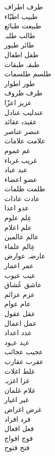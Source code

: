 \documentclass[a4paper]{article}
\begin{document}
\begin{multicols}{3}
\begin{tabbing}
طرف \> اطراف\\
طبیب \> اطبّاء\\
طبیعت \> طبائع\\
طالب \> طلبہ\\
طائر \> طیور\\
طفل \> اطفال\\
طبقہ \> طبقات\\
طلسم \> طلسمات\\
طور \> اطوار\\
ظرف \> ظروف\\
عزیز \> اعزّا\\
عندلیب \> عنادل\\
عقیدہ \> عقائد\\
عنصر \> عناصر\\
علامت \> علامات\\
غم \> غموم\\
غریب \> غرباء\\
عبد \> عباد\\
عضو \> اعضاء\\
ظلمت \> ظلمات\\
عادت \> عادات\\
عدو \> اعدا\\
عِلم \> علوم\\
علم \> اعلام\\
عالم \> عالمین\\
عِالم \> علماء\\
عارضہ \> عوارض\\
عمر \> اعمار\\
عیب \> عیوب\\
عاشق \> عُشاق\\
عزم \> عزائم\\
عام \> عوام\\
عقل \> عقول\\
عمل \> اعمال\\
عدد \> اعداد\\
عہد \> عہود\\
عجیب \> عجائب\\
عقرب \> عقارب\\
غلط \> اغلات\\
غزا \> اغزیہ\\
غلام \> غلمان\\
غیر \> اغیار\\
غرض \> اغراض\\
فرد \> افراد\\
فعل \> افعال\\
فوج \> افواج\\
فتح \> فتوح\\

\end{tabbing}
\end{multicols}
\end{document}
